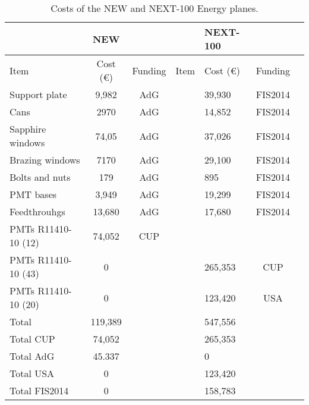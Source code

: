 \begin{table}[h!]
\begin{center}
\begin{tabular}{|l|c|c||l|l|c|c|}
\hline
&{\bf NEW}	& & & {\bf NEXT-100} &  \\
\hline	
 Item & Cost (\euro) & Funding &  Item & Cost (\euro) & Funding   \\
\hline
Support plate & 	9,982 &	AdG	&&	39,930 &	FIS2014\\
Cans	 & 2970 &	AdG	&& 14,852 &	FIS2014\\
Sapphire windows & 74,05 &	AdG	&&	37,026 &	FIS2014\\
Brazing windows &	7170 &	AdG	&&	29,100 &	FIS2014\\
Bolts and nuts	& 179 &	AdG &&		895 &	FIS2014\\
PMT bases &	3,949 &	AdG &&		19,299 & 	FIS2014\\
Feedthrouhgs &13,680 &	AdG	&&	17,680 & FIS2014 \\
PMTs R11410-10 (12) &	74,052 &	CUP &		 &  & \\	
PMTs R11410-10 (43) &	0 &  & &			265,353 &	CUP\\
PMTs R11410-10 (20) & 0 &  &&			123,420 &	USA\\
\hline
Total &	119,389 & & 	&		547,556 & \\	
Total CUP	& 74,052 &&	&		265,353 & \\	
Total AdG	&45.337 &&	&		0 & \\	
Total USA	& 0 &&		&	123,420 & \\	
Total FIS2014	& 0 &&	&		158,783 &\\		
\hline\hline
\end{tabular}  
\caption{Costs of the NEW and NEXT-100 Energy planes. }
\label{tab:PV}
\end{center}
\end{table} 

